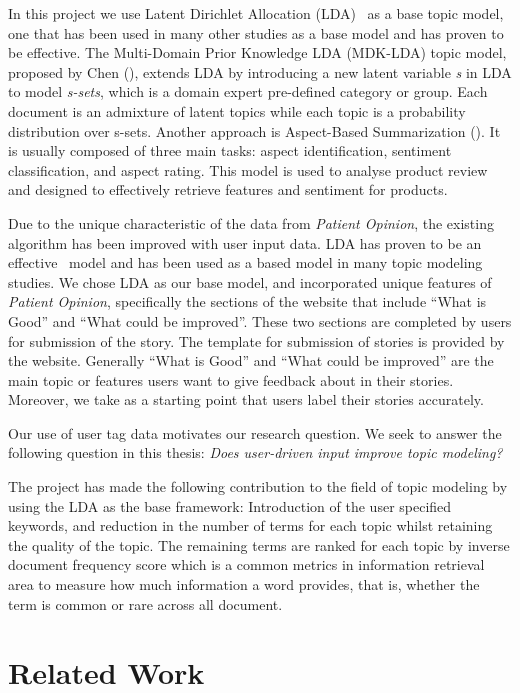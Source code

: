 \documentclass[11pt,twoside]{report}
\begin{document}
In this project we use Latent Dirichlet Allocation (LDA)~\cite{ref25}
as a base topic model,
one that has been used in many other studies as a base model and has 
proven to be effective. The Multi-Domain Prior Knowledge LDA (MDK-LDA) 
topic model,
proposed by Chen (\cite{ref24}),  extends LDA by introducing a new latent variable \emph{s} in LDA to model \emph{s-sets}, which is a domain expert pre-defined category or group. Each document is an admixture of latent topics while each topic is a probability distribution over s-sets. Another approach is Aspect-Based Summarization (\cite{ref11}). It is usually composed of three main tasks: aspect identification, sentiment classification, and aspect rating. This model is used to analyse product review and designed to effectively retrieve features and sentiment for products.

Due to the unique characteristic of the data from \emph{Patient Opinion}, the existing 
algorithm has been improved with user input data. LDA has proven to be 
an effective  model and has been used as a based model in many topic modeling 
studies. We chose LDA as our base model, and incorporated unique features of \emph{Patient Opinion}, specifically the sections of the website that
include ``What is Good'' and 
``What could be improved''. These two sections are completed by users 
for submission of the story. The template for submission of stories is 
provided by the website. Generally ``What is Good'' and 
``What could be improved'' are the main topic or features users want to give 
feedback about in their stories. Moreover, we take as a starting point that 
 users label their stories accurately.

Our use of user tag data motivates our research question. We seek to answer the following question in this thesis:
\emph{Does user-driven input improve topic modeling?}

The project has made the following contribution to the field of topic modeling by using the LDA as the base framework:
Introduction of the user specified keywords, and reduction in the number of terms for each topic whilst retaining the quality of the topic. The remaining terms are ranked for each topic by inverse document frequency score which is a common metrics in information retrieval area to measure how much information a word provides, that is, whether the term is common or rare across all document. 

\chapter{Related Work}
\end{document}
